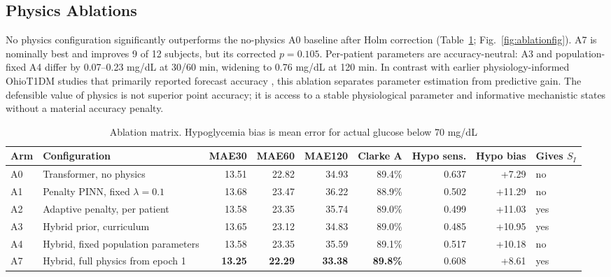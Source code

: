 \documentclass[journal]{IEEEtran}
\begin{document}
\subsection{Physics Ablations}

No physics configuration significantly outperforms the no-physics A0 baseline after Holm correction (Table~\ref{tab:ablation}; Fig.~\ref{fig:ablationfig}). A7 is nominally best and improves 9 of 12 subjects, but its corrected $p = 0.105$. Per-patient parameters are accuracy-neutral: A3 and population-fixed A4 differ by 0.07–0.23 mg/dL at 30/60 min, widening to 0.76 mg/dL at 120 min. In contrast with earlier physiology-informed OhioT1DM studies that primarily reported forecast accuracy \cite{ref58,ref59}, this ablation separates parameter estimation from predictive gain. The defensible value of physics is not superior point accuracy; it is access to a stable physiological parameter and informative mechanistic states without a material accuracy penalty.

\begin{table}[t]
\centering
\caption{Ablation matrix. Hypoglycemia bias is mean error for actual glucose below 70 mg/dL}
\label{tab:ablation}
\footnotesize
\begin{tabular}{llrrrrrrl}
\toprule
Arm & Configuration & MAE30 & MAE60 & MAE120 & Clarke A & Hypo sens. & Hypo bias & Gives $S_I$ \\
\midrule
A0 & Transformer, no physics & 13.51 & 22.82 & 34.93 & 89.4\% & 0.637 & +7.29 & no \\
A1 & Penalty PINN, fixed $\lambda=0.1$ & 13.68 & 23.47 & 36.22 & 88.9\% & 0.502 & +11.29 & no \\
A2 & Adaptive penalty, per patient & 13.58 & 23.35 & 35.74 & 89.0\% & 0.499 & +11.03 & yes \\
A3 & Hybrid prior, curriculum & 13.65 & 23.12 & 34.83 & 89.0\% & 0.485 & +10.95 & yes \\
A4 & Hybrid, fixed population parameters & 13.58 & 23.35 & 35.59 & 89.1\% & 0.517 & +10.18 & no \\
A7 & Hybrid, full physics from epoch 1 & \textbf{13.25} & \textbf{22.29} & \textbf{33.38} & \textbf{89.8\%} & 0.608 & +8.61 & yes \\
\bottomrule
\end{tabular}
\end{table}

\tabA
{}\tabB
{}\tabC
{}\tabD
{}\tabE
{}\tabF
{}\of\tabA \global\let\ablA=\pgfplotsretval
{}\of\tabB \global\let\ablB=\pgfplotsretval
{}\of\tabC \global\let\ablC=\pgfplotsretval
{}\of\tabD \global\let\ablD=\pgfplotsretval
{}\of\tabE \global\let\ablE=\pgfplotsretval
{}\of\tabF \global\let\ablF=\pgfplotsretval
\end{document}
